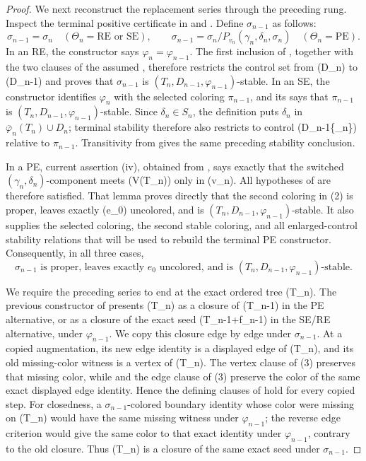 \begin{proof}
We next reconstruct the replacement series through the preceding rung.
Inspect the terminal positive certificate in
 and .  Define
\(\sigma_{n-1}\) as follows:
\[
 \sigma_{n-1}=\sigma_n\quad(\Theta_n=\mathrm{RE}\text{ or }\mathrm{SE}),
 \qquad
 \sigma_{n-1}=\sigma_n/P_{v_n}(\gamma_n,\delta_n,\sigma_n)
       \quad(\Theta_n=\mathrm{PE}).                           \tag{2}
\]
In an RE, the constructor says \(\varphi_n=\varphi_{n-1}\).  The first
inclusion of , together with the two
clauses of the assumed , therefore restricts the
control set from (D_n) to (D_{n-1}) and proves that
\(\sigma_{n-1}\) is \((T_n,D_{n-1},\varphi_{n-1})\)-stable.  In an SE,
the constructor identifies \(\varphi_n\) with the selected coloring
\(\pi_{n-1}\), and its  says that
\(\pi_{n-1}\) is \((T_n,D_{n-1},\varphi_{n-1})\)-stable.  Since
\(\delta_n\in S_n\), the definition 
puts \(\delta_n\) in
\(\overline\varphi_n(T_n)\cup D_n\); terminal stability therefore also
restricts to control (D_{n-1}\cup\{\delta_n\}) relative to
\(\pi_{n-1}\).  Transitivity from  gives the same preceding
stability conclusion.

In a PE, current assertion (iv), obtained from
, says exactly that the switched
\((\gamma_n,\delta_n)\)-component meets (V(T_n)) only in (v_n).
All hypotheses of  are therefore
satisfied.  That lemma proves directly that the second coloring in (2)
is proper, leaves exactly (e_0) uncolored, and is
\((T_n,D_{n-1},\varphi_{n-1})\)-stable.  It also supplies the selected
coloring, the second stable coloring, and all enlarged-control stability
relations that will be used to rebuild the terminal PE constructor.
Consequently, in all three cases,
\[
 \sigma_{n-1}\text{ is proper, leaves exactly }e_0\text{ uncolored, and is }
 (T_n,D_{n-1},\varphi_{n-1})\text{-stable}.                    \tag{3}
\]

We require the preceding series to end at the exact ordered tree (T_n).
The previous constructor of  presents (T_n)
as a closure of (T_{n-1}) in the PE alternative, or as a closure of the
exact seed (T_{n-1}+f_{n-1}) in the SE/RE alternative, under
\(\varphi_{n-1}\).  We copy this closure edge by edge under
\(\sigma_{n-1}\).  At a copied augmentation, its new edge identity is a
displayed edge of (T_n), and its old missing-color witness is a vertex
of (T_n).  The vertex clause of (3) preserves that missing color, while
 and the edge clause of (3) preserve the
color of the same exact displayed edge identity.  Hence the defining
clauses of  hold for every copied step.
For closedness, a \(\sigma_{n-1}\)-colored boundary identity whose color
were missing on (T_n) would have the same missing witness under
\(\varphi_{n-1}\); the reverse edge criterion  would give
the same color to that exact identity under \(\varphi_{n-1}\), contrary
to the old closure.  Thus (T_n) is a closure of the same exact seed
under \(\sigma_{n-1}\).                                      


\end{proof}
